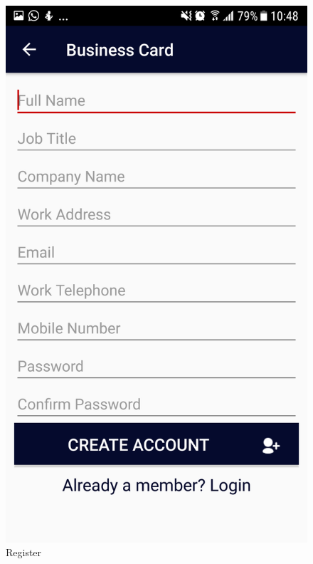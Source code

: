 \documentclass[english]{article}
\begin{document}
\begin{figure}[!htb]
  \includegraphics[width=\linewidth]{Register.png}
  \caption{Register}\label{Register}
\endminipage\hfill
{}%

\end{figure}
\end{document}
